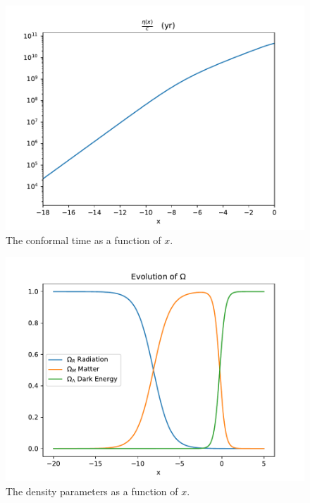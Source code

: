 \documentclass{aa}
\begin{document}
\begin{figure}[h!]
   \includegraphics[scale=0.6]{../figures/milestone1/eta_x.pdf}
   \caption{The conformal time as a function of $x$.}\label{fig:M1_eta_x}
\end{figure}

\begin{figure}[h!]
   \includegraphics[scale=0.6]{../figures/milestone1/Omegas.pdf}
   \caption{The density parameters as a function of $x$.}\label{fig:M1_Omegas}
\end{figure}
\end{document}
